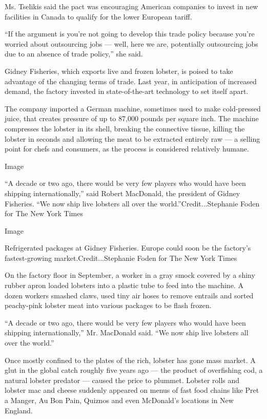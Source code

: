 Ms. Tselikis said the pact was encouraging American companies to invest
in new facilities in Canada to qualify for the lower European tariff.

``If the argument is you're not going to develop this trade policy
because you're worried about outsourcing jobs --- well, here we are,
potentially outsourcing jobs due to an absence of trade policy,'' she
said.

Gidney Fisheries, which exports live and frozen lobster, is poised to
take advantage of the changing terms of trade. Last year, in
anticipation of increased demand, the factory invested in
state-of-the-art technology to set itself apart.

The company imported a German machine, sometimes used to make
cold-pressed juice, that creates pressure of up to 87,000 pounds per
square inch. The machine compresses the lobster in its shell, breaking
the connective tissue, killing the lobster in seconds and allowing the
meat to be extracted entirely raw --- a selling point for chefs and
consumers, as the process is considered relatively humane.

Image

``A decade or two ago, there would be very few players who would have
been shipping internationally,'' said Robert MacDonald, the president of
Gidney Fisheries. ``We now ship live lobsters all over the
world.''Credit...Stephanie Foden for The New York Times

Image

Refrigerated packages at Gidney Fisheries. Europe could soon be the
factory's fastest-growing market.Credit...Stephanie Foden for The New
York Times

On the factory floor in September, a worker in a gray smock covered by a
shiny rubber apron loaded lobsters into a plastic tube to feed into the
machine. A dozen workers smashed claws, used tiny air hoses to remove
entrails and sorted peachy-pink lobster meat into various packages to be
flash frozen.

``A decade or two ago, there would be very few players who would have
been shipping internationally,'' Mr. MacDonald said. ``We now ship live
lobsters all over the world.''

Once mostly confined to the plates of the rich, lobster has gone mass
market. A glut in the global catch roughly five years ago --- the
product of overfishing cod, a natural lobster predator --- caused the
price to plummet. Lobster rolls and lobster mac and cheese suddenly
appeared on menus of fast food chains like Pret a Manger, Au Bon Pain,
Quiznos and even McDonald's locations in New England.

